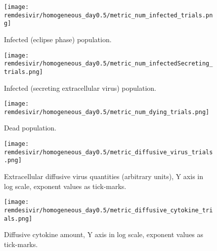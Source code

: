 \begin{figure}[H]
\texttt{[image: remdesivir/homogeneous\_day0.5/metric\_num\_infected\_trials.png]}
\caption{Infected (eclipse phase) population.\label{fig:app:homo_regular:day0.5:inf}}
\end{figure}

\begin{figure}[H]
\texttt{[image: remdesivir/homogeneous\_day0.5/metric\_num\_infectedSecreting\_trials.png]}
\caption{Infected (secreting extracellular virus) population.\label{fig:app:homo_regular:day0.5:infSecr}}
\end{figure}

\begin{figure}[H]
\texttt{[image: remdesivir/homogeneous\_day0.5/metric\_num\_dying\_trials.png]}
\caption{Dead population.\label{fig:app:homo_regular:day0.5:dead}}
\end{figure}

\begin{figure}[H]
\texttt{[image: remdesivir/homogeneous\_day0.5/metric\_diffusive\_virus\_trials.png]}
\caption{Extracellular diffusive virus quantities (arbitrary units), Y axis in log scale, exponent values as tick-marks.\label{fig:app:homo_regular:day0.5:diff_vir}}
\end{figure}



\begin{figure}[H]
\texttt{[image: remdesivir/homogeneous\_day0.5/metric\_diffusive\_cytokine\_trials.png]}
\caption{Diffusive cytokine amount, Y axis in log scale, exponent values as tick-marks.\label{fig:app:homo_regular:day0.5:diff_cyto}}
\end{figure}


